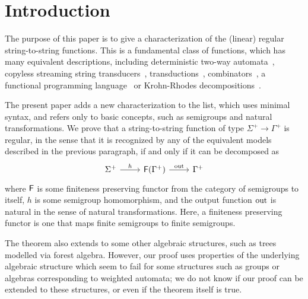 \section{Introduction}
\label{sec:intro}

The purpose of this paper is to give a characterization of the (linear) regular string-to-string functions. This is a fundamental class of functions, which has many equivalent descriptions, including deterministic two-way automata~\cite[Note 4]{shepherdson1959reduction}, copyless streaming string transducers~\cite[Section 3]{alurExpressivenessStreamingString2010}, \mso transductions~\cite[Theorem 13]{engelfrietMSODefinableString2001}, combinators~\cite[Section 2]{alur2014regular}, a functional programming language~\cite[Section 6]{bojanczykRegularFirstOrderList2018} or Krohn-Rhodes decompositions~\cite[Theorem 18, item 4]{bojanczykstefanski2020}. 


The present paper adds a new characterization to the list, which uses minimal syntax, and refers only to basic concepts, such as semigroups and natural transformations. We prove that a string-to-string function of type $\Sigma^+ \to \Gamma^+$ is regular, in the sense that it is recognized by any of the equivalent models described in the previous paragraph, if and only if it can be decomposed as 
\[
\begin{tikzcd}
    \Sigma^+ 
    \ar[r,"h"]
    & 
    \functor(\Gamma^+)
    \ar[r,"\outfun"]
    &
    \Gamma^+
\end{tikzcd}
\]
where $\mathsf F$ is some finiteness preserving functor from the category of semigroups to itself, $h$ is some semigroup homomorphism, and the output function $\mathrm{out}$ is natural in the sense of natural transformations. Here, a finiteness preserving functor is one that maps finite semigroups to finite semigroups. 


The theorem also extends to some other algebraic structures, such as trees modelled via forest algebra. However, our proof uses properties of the underlying algebraic structure which seem to fail for some structures such as groups or algebras corresponding to weighted automata; we do not know if our proof can be extended to  these structures, or even if the theorem itself is true.

